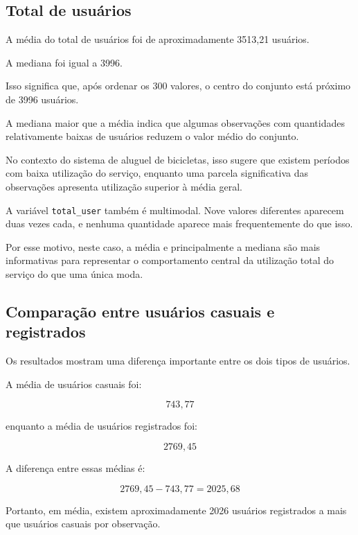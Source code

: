 \documentclass[12pt,a4paper]{article}
\begin{document}
\subsection{Total de usuários}

A média do total de usuários foi de aproximadamente 3513,21 usuários.

A mediana foi igual a 3996.

Isso significa que, após ordenar os 300 valores, o centro do conjunto está
próximo de 3996 usuários.

A mediana maior que a média indica que algumas observações com quantidades
relativamente baixas de usuários reduzem o valor médio do conjunto.

No contexto do sistema de aluguel de bicicletas, isso sugere que existem
períodos com baixa utilização do serviço, enquanto uma parcela significativa
das observações apresenta utilização superior à média geral.

A variável \texttt{total\_user} também é multimodal. Nove valores diferentes
aparecem duas vezes cada, e nenhuma quantidade aparece mais frequentemente
do que isso.

Por esse motivo, neste caso, a média e principalmente a mediana são mais
informativas para representar o comportamento central da utilização total
do serviço do que uma única moda.

\subsection{Comparação entre usuários casuais e registrados}

Os resultados mostram uma diferença importante entre os dois tipos de
usuários.

A média de usuários casuais foi:

\begin{equation}
743{,}77
\end{equation}

enquanto a média de usuários registrados foi:

\begin{equation}
2769{,}45
\end{equation}

A diferença entre essas médias é:

\begin{equation}
2769{,}45 - 743{,}77 = 2025{,}68
\end{equation}

Portanto, em média, existem aproximadamente 2026 usuários registrados a mais
que usuários casuais por observação.
\end{document}
